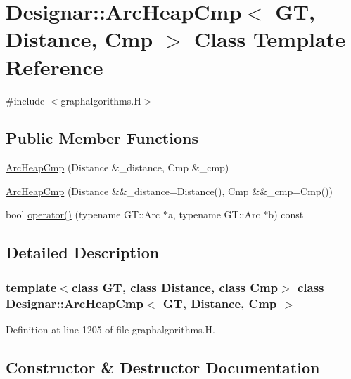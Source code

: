 \hypertarget{class_designar_1_1_arc_heap_cmp}{}\section{Designar\+:\+:Arc\+Heap\+Cmp$<$ GT, Distance, Cmp $>$ Class Template Reference}
\label{class_designar_1_1_arc_heap_cmp}


{\ttfamily \#include $<$graphalgorithms.\+H$>$}

\subsection*{Public Member Functions}
\begin{DoxyCompactItemize}
\item 
\hyperlink{class_designar_1_1_arc_heap_cmp_a0fcb5ba151f45638b73534dc80af8a81}{Arc\+Heap\+Cmp} (Distance \&\+\_\+distance, Cmp \&\+\_\+cmp)
\item 
\hyperlink{class_designar_1_1_arc_heap_cmp_a4a698d49f62f6261afcf3c49e4c09381}{Arc\+Heap\+Cmp} (Distance \&\&\+\_\+distance=Distance(), Cmp \&\&\+\_\+cmp=Cmp())
\item 
bool \hyperlink{class_designar_1_1_arc_heap_cmp_a9d86fd876bad098a0a6844e9b302f141}{operator()} (typename G\+T\+::\+Arc $\ast$a, typename G\+T\+::\+Arc $\ast$b) const
\end{DoxyCompactItemize}


\subsection{Detailed Description}
\subsubsection*{template$<$class GT, class Distance, class Cmp$>$\newline
class Designar\+::\+Arc\+Heap\+Cmp$<$ G\+T, Distance, Cmp $>$}



Definition at line 1205 of file graphalgorithms.\+H.



\subsection{Constructor \& Destructor Documentation}
\mbox{\label{class_designar_1_1_arc_heap_cmp_a0fcb5ba151f45638b73534dc80af8a81}} 
